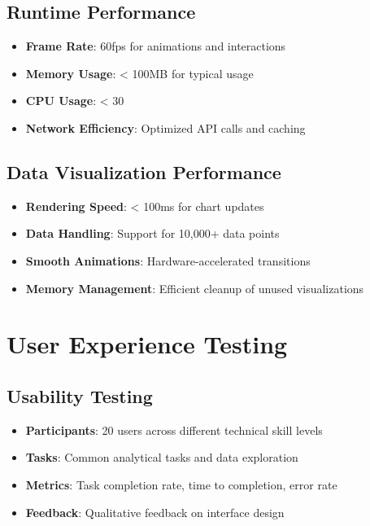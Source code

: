 \subsection{Runtime Performance}
\begin{itemize}
\item \textbf{Frame Rate}: 60fps for animations and interactions
\item \textbf{Memory Usage}: < 100MB for typical usage
\item \textbf{CPU Usage}: < 30%
\item \textbf{Network Efficiency}: Optimized API calls and caching
\end{itemize}

\subsection{Data Visualization Performance}
\begin{itemize}
\item \textbf{Rendering Speed}: < 100ms for chart updates
\item \textbf{Data Handling}: Support for 10,000+ data points
\item \textbf{Smooth Animations}: Hardware-accelerated transitions
\item \textbf{Memory Management}: Efficient cleanup of unused visualizations
\end{itemize}


\section{User Experience Testing}

\subsection{Usability Testing}
\begin{itemize}
\item \textbf{Participants}: 20 users across different technical skill levels
\item \textbf{Tasks}: Common analytical tasks and data exploration
\item \textbf{Metrics}: Task completion rate, time to completion, error rate
\item \textbf{Feedback}: Qualitative feedback on interface design
\end{itemize}

